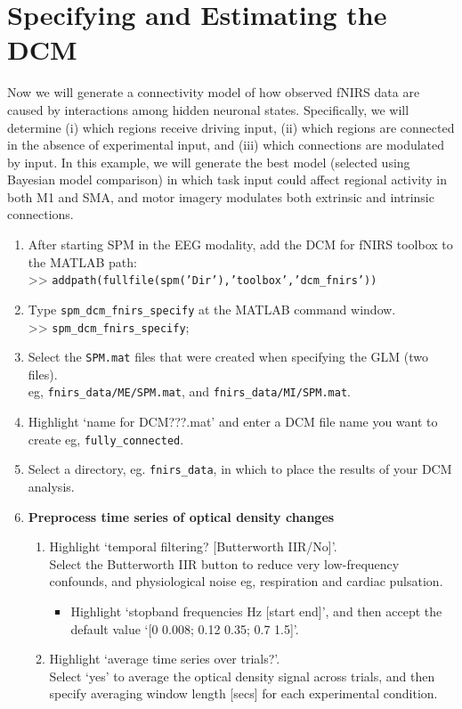 \section{Specifying and Estimating the DCM}
Now we will generate a connectivity model of how observed fNIRS data are caused by interactions among hidden neuronal states. Specifically, we will determine (i) which regions receive driving input, (ii) which regions are connected in the absence of experimental input, and (iii) which connections are modulated by input. In this example, we will generate the best model (selected using Bayesian model comparison) in which task input could affect regional activity in both M1 and SMA, and motor imagery modulates both extrinsic and intrinsic connections. 

\begin{enumerate} 
\item After starting SPM in the EEG modality, add the DCM for fNIRS toolbox to the MATLAB path:\\
>> \texttt{addpath(fullfile(spm('Dir'),'toolbox','dcm\_fnirs'))}
\item Type \texttt{spm\_dcm\_fnirs\_specify} at the MATLAB command window. \\
>> \texttt{spm\_dcm\_fnirs\_specify};
\item Select the \texttt{SPM.mat} files that were created when specifying the GLM (two files). \\
eg, \texttt{fnirs\_data/ME/SPM.mat}, and \texttt{fnirs\_data/MI/SPM.mat}.
\item Highlight `name for DCM\textunderscore???.mat' and enter a DCM file name you want to create eg, \texttt{fully\_connected}.
\item Select a directory, eg. \texttt{fnirs\_data}, in which to place the results of your DCM analysis.
\item \textbf{Preprocess time series of optical density changes}
\begin{enumerate} 
\item Highlight `temporal filtering? [Butterworth IIR/No]'. \\Select the Butterworth IIR button to reduce very low-frequency confounds, and physiological noise eg, respiration and cardiac pulsation.
\begin{itemize}
\item Highlight `stopband frequencies Hz [start end]', and then accept the default value `[0 0.008; 0.12 0.35; 0.7 1.5]'.
\end{itemize}
\item Highlight `average time series over trials?'. \\Select `yes' to average the optical density signal across trials, and then specify averaging window length [secs] for each experimental condition. 

\end{enumerate}
\end{enumerate}

